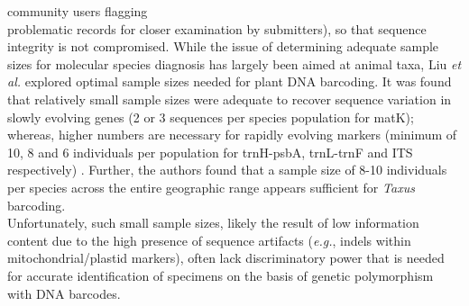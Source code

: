 community users flagging \\ problematic records for closer examination by submitters), so that sequence integrity is not compromised. While the issue of determining adequate sample sizes for molecular species diagnosis has largely been aimed at animal taxa, Liu \textit{et al.} \cite{liu2012sampling} explored optimal sample sizes needed for plant DNA barcoding. It was found that relatively small sample sizes were adequate to recover sequence variation in slowly evolving genes (2 or 3 sequences per species population for matK); whereas, higher numbers are necessary for rapidly evolving markers (minimum of 10, 8 and 6 individuals per population for trnH-psbA, trnL-trnF and ITS respectively) \cite{liu2012sampling}. Further, the authors found that a sample size of 8-10 individuals per species across the entire geographic range appears sufficient for \textit{Taxus} barcoding. \\ Unfortunately, such small sample sizes, likely the result of low information content due to the high presence of sequence artifacts (\textit{e.g.}, indels within mitochondrial/plastid markers), often lack discriminatory power that is needed for accurate identification of specimens on the basis of genetic polymorphism with DNA barcodes.

\vspace{5mm} 


